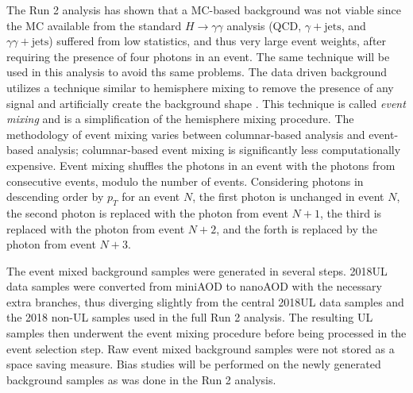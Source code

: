 \documentclass[12pt]{article}
\begin{document}
The Run 2 analysis has shown that a MC-based background was not viable since the MC available from the standard $H \rightarrow \gamma\gamma$ analysis (QCD, $\gamma + \mathrm{jets}$, and $\gamma\gamma + \mathrm{jets}$) suffered from low statistics, and thus very large event weights, after requiring the presence of four photons in an event. The same technique will be used in this analysis to avoid ths same problems. The data driven background utilizes a technique similar to hemisphere mixing to remove the presence of any signal and artificially create the background shape \cite{hemisphere_mixing}. This technique is called \textit{event mixing} and is a simplification of the hemisphere mixing procedure. The methodology of event mixing varies between columnar-based analysis and event-based analysis; columnar-based event mixing is significantly less computationally expensive. Event mixing shuffles the photons in an event with the photons from consecutive events, modulo the number of events. Considering photons in descending order by $p_T$ for an event $N$, the first photon is unchanged in event $N$, the second photon is replaced with the photon from event $N+1$, the third is replaced with the photon from event $N+2$, and the forth is replaced by the photon from event $N+3$.\par

The event mixed background samples were generated in several steps. 2018UL data samples were converted from miniAOD to nanoAOD with the necessary extra branches, thus diverging slightly from the central 2018UL data samples and the 2018 non-UL samples used in the full Run 2 analysis. The resulting UL samples then underwent the event mixing procedure before being processed in the event selection step. Raw event mixed background samples were not stored as a space saving measure. Bias studies will be performed on the newly generated background samples as was done in the Run 2 analysis.\par
\end{document}
